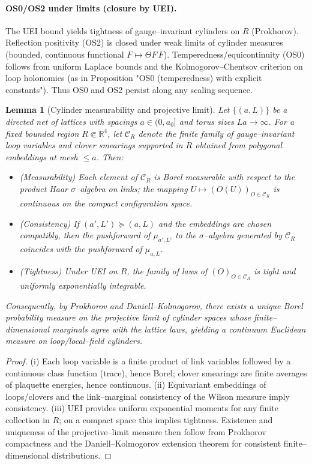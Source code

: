\documentclass[11pt]{amsart}
\theoremstyle{plain}
\newtheorem{lemma}[theorem]{Lemma}
\theoremstyle{definition}
\theoremstyle{remark}
\begin{document}
\paragraph{OS0/OS2 under limits (closure by UEI).}
The UEI bound yields tightness of gauge--invariant cylinders on $R$ (Prokhorov). Reflection positivity (OS2) is closed under weak limits of cylinder measures (bounded, continuous functional $F\mapsto \Theta F\,\overline{F}$). Temperedness/equicontinuity (OS0) follows from uniform Laplace bounds and the Kolmogorov--Chentsov criterion on loop holonomies (as in Proposition "OS0 (temperedness) with explicit constants"). Thus OS0 and OS2 persist along any scaling sequence.

\begin{lemma}[Cylinder measurability and projective limit]\label{lem:cylinder-projective}
Let $\{(a,L)\}$ be a directed net of lattices with spacings $a\in(0,a_0]$ and torus sizes $La\to\infty$. For a fixed bounded region $R\Subset\mathbb R^4$, let $\mathcal C_R$ denote the finite family of gauge--invariant loop variables and clover smearings supported in $R$ obtained from polygonal embeddings at mesh $\le a$. Then:
\begin{itemize}
  \item[(i)] (Measurability) Each element of $\mathcal C_R$ is Borel measurable with respect to the product Haar $\sigma$--algebra on links; the mapping $U\mapsto (O(U))_{O\in\mathcal C_R}$ is continuous on the compact configuration space.
  \item[(ii)] (Consistency) If $(a',L')\succeq(a,L)$ and the embeddings are chosen compatibly, then the pushforward of $\mu_{a',L'}$ to the $\sigma$--algebra generated by $\mathcal C_R$ coincides with the pushforward of $\mu_{a,L}$.
  \item[(iii)] (Tightness) Under UEI on $R$, the family of laws of $(O)_{O\in\mathcal C_R}$ is tight and uniformly exponentially integrable.
\end{itemize}
Consequently, by Prokhorov and Daniell--Kolmogorov, there exists a unique Borel probability measure on the projective limit of cylinder spaces whose finite--dimensional marginals agree with the lattice laws, yielding a continuum Euclidean measure on loop/local--field cylinders.
\end{lemma}
\begin{proof}
(i) Each loop variable is a finite product of link variables followed by a continuous class function (trace), hence Borel; clover smearings are finite averages of plaquette energies, hence continuous. (ii) Equivariant embeddings of loops/clovers and the link--marginal consistency of the Wilson measure imply consistency. (iii) UEI provides uniform exponential moments for any finite collection in $R$; on a compact space this implies tightness. Existence and uniqueness of the projective--limit measure then follow from Prokhorov compactness and the Daniell--Kolmogorov extension theorem for consistent finite--dimensional distributions.
\end{proof}
\end{document}
